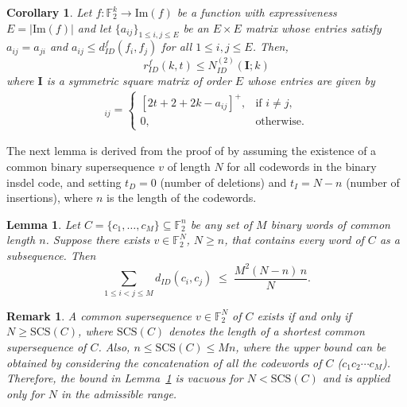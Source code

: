 \documentclass[11 pt]{article}
\numberwithin{equation}{section}
\newtheorem{corollary}[theorem]{Corollary}
\newtheorem{lemma}[theorem]{Lemma}
\newtheorem{remark}[theorem]{Remark}
\begin{document}
        \begin{corollary}\label{optional_red_and_function_dis_bound}
            Let $f: \mathbb{F}_2^k \rightarrow \mathrm{Im}(f)$ be a function with expressiveness $E = |\mathrm{Im}(f)|$ and let $\{a_{ij}\}_{1 \leq i, j \leq E}$ be an $E \times E$ matrix whose entries satisfy $a_{ij} = a_{ji}$ and $a_{ij} \leq d^{f}_{ID}(f_i, f_j)$ for all $1 \leq i, j \leq E$. Then,
            $$r_{ID}^f(k,t) \leq N_{ID}^{(2)}(\bm{I};k)$$
            where $\bm{I}$ is a symmetric square matrix of order $E$ whose entries are given by 
            \begin{align*}
             [\bm{I}]_{ij} =
            \begin{cases} 
                [2t + 2 + 2k - a_{ij}]^{+}, & \text{if } i \neq j, \\ 
                0, & \text{otherwise}.
            \end{cases}
            \end{align*}
        \end{corollary}


    The next lemma is derived from the proof of \cite[Lemma 1]{hayashi2020list} by assuming the existence of a common binary supersequence $v$ of length $N$ for all codewords in the binary insdel code, and setting $t_D = 0$ (number of deletions) and $t_I = N - n$ (number of insertions), where $n$ is the length of the codewords.
    

    \begin{lemma}\label{lem:superseq-plotkin}
        Let $C=\{c_1,\dots,c_M\}\subseteq\mathbb{F}_2^{n}$ be any set of $M$ binary words of common length $n$. Suppose there exists $v\in\mathbb{F}_2^{N}$, $N\ge n$, that contains every word of $C$ as a subsequence. Then
        \[
        \sum_{1\le i<j\le M} d_{ID}(c_i,c_j)\;\le\;\frac{M^{2}(N-n)\,n}{N}.
        \]
    \end{lemma}

    \begin{remark}\label{rem:superseq-existence}
    A common supersequence $v\in\mathbb{F}_2^{N}$ of $C$ exists if and only if $N\ge \mathrm{SCS}(C)$, where $\mathrm{SCS}(C)$ denotes the length of a shortest common supersequence of $C$. Also, $n\le \mathrm{SCS}(C)\le Mn$, where the upper bound can be obtained by considering the concatenation of all the codewords of $C$ ($c_1c_2\cdots c_M$). Therefore, the bound in Lemma~\ref{lem:superseq-plotkin} is vacuous for $N<\mathrm{SCS}(C)$ and is applied only for $N$ in the admissible range.
    \end{remark}
\end{document}
